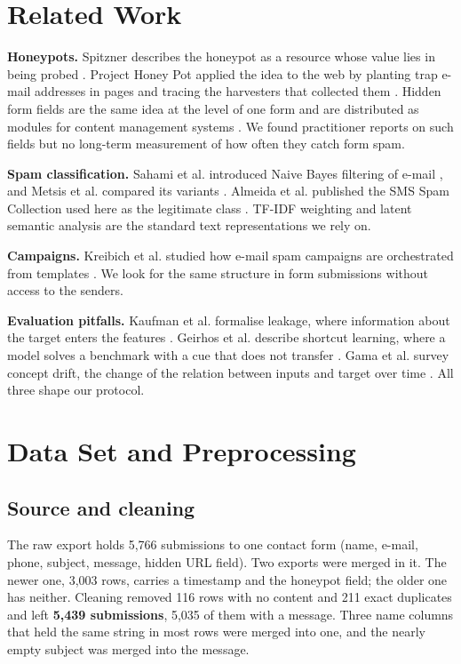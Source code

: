 \documentclass[conference]{IEEEtran}
\begin{document}
\section{Related Work}

\textbf{Honeypots.} Spitzner describes the honeypot as a resource whose value lies in being probed
\cite{spitzner2002}. Project Honey Pot applied the idea to the web by planting trap e-mail addresses in pages
and tracing the harvesters that collected them \cite{prince2005}. Hidden form fields are the same idea at the
level of one form and are distributed as modules for content management systems \cite{geerling2011}. We found
practitioner reports on such fields but no long-term measurement of how often they catch form spam.

\textbf{Spam classification.} Sahami et al. introduced Naive Bayes filtering of e-mail \cite{sahami1998}, and
Metsis et al. compared its variants \cite{metsis2006}. Almeida et al. published the SMS Spam Collection used
here as the legitimate class \cite{almeida2011}. TF-IDF weighting \cite{salton1988} and latent semantic
analysis \cite{deerwester1990} are the standard text representations we rely on.

\textbf{Campaigns.} Kreibich et al. studied how e-mail spam campaigns are orchestrated from templates
\cite{kreibich2009}. We look for the same structure in form submissions without access to the senders.

\textbf{Evaluation pitfalls.} Kaufman et al. formalise leakage, where information about the target enters the
features \cite{kaufman2012}. Geirhos et al. describe shortcut learning, where a model solves a benchmark with a
cue that does not transfer \cite{geirhos2020}. Gama et al. survey concept drift, the change of the relation
between inputs and target over time \cite{gama2014}. All three shape our protocol.

\section{Data Set and Preprocessing}

\subsection{Source and cleaning}

The raw export holds 5,766 submissions to one contact form (name, e-mail, phone, subject, message, hidden URL
field). Two exports were merged in it. The newer one, 3,003 rows, carries a timestamp and the honeypot field;
the older one has neither. Cleaning removed 116 rows with no content and 211 exact duplicates and left
\textbf{5,439 submissions}, 5,035 of them with a message. Three name columns that held the same string in most
rows were merged into one, and the nearly empty subject was merged into the message.
\end{document}
